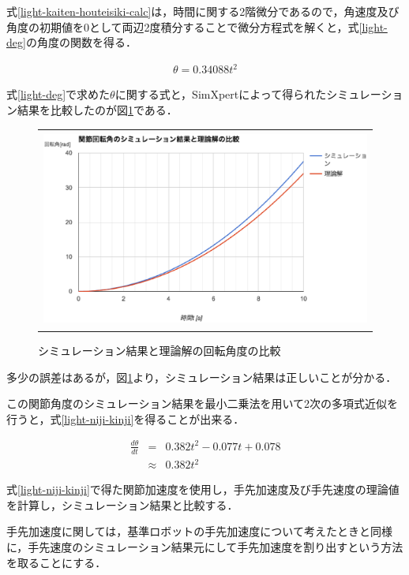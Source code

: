 式\ref{light-kaiten-houteisiki-calc}は，時間に関する2階微分であるので，角速度及び角度の初期値を0として両辺2度積分することで微分方程式を解くと，式\ref{light-deg}の角度の関数を得る．

\begin{eqnarray}
  \theta = 0.34088t^2
  \label{light-deg}
\end{eqnarray}

式\ref{light-deg}で求めた\(\theta\)に関する式と，SimXpertによって得られたシミュレーション結果を比較したのが図\ref{compare-light}である．

\begin{figure}[htbp]
  \begin{center}
    \begin{tabular}{c}
      \includegraphics[height=6.5cm]{img/eps/compare-light.eps}
    \end{tabular}
    \caption{シミュレーション結果と理論解の回転角度の比較}
    \label{compare-light}
  \end{center}
\end{figure}

多少の誤差はあるが，図\ref{compare-light}より，シミュレーション結果は正しいことが分かる．

この関節角度のシミュレーション結果を最小二乗法を用いて2次の多項式近似を行うと，式\ref{light-niji-kinji}を得ることが出来る．

\begin{eqnarray}
  \frac{d\theta}{dt} &=& 0.382t^2-0.077t+0.078\nonumber \\
  &\approx& 0.382t^2
  \label{light-niji-kinji}
\end{eqnarray}

式\ref{light-niji-kinji}で得た関節加速度を使用し，手先加速度及び手先速度の理論値を計算し，シミュレーション結果と比較する．

手先加速度に関しては，基準ロボットの手先加速度について考えたときと同様に，手先速度のシミュレーション結果元にして手先加速度を割り出すという方法を取ることにする．

